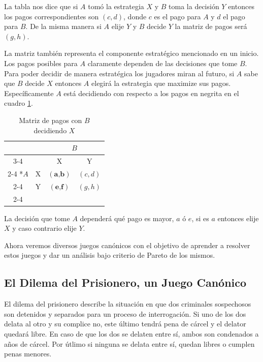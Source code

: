 La tabla nos dice que si $A$ tomó la estrategia $X$ y $B$ toma la decisión $Y$ entonces los pagos correspondientes son $(c,d)$, donde $c$ es el pago para $A$ y $d$ el pago para $B$. De la misma manera si $A$ elije $Y$ y $B$ decide $Y$ la matriz de pagos será $(g,h)$. 

La matriz también representa el componente estratégico mencionado en un inicio. Los pagos posibles para $A$ claramente dependen de las decisiones que tome $B$. Para poder decidir de manera estratégica los jugadores miran al futuro, si $A$ sabe que $B$ decide $X$ entonces $A$ elegirá la estrategia que maximize sus pagos. Específicamente $A$ está decidiendo con respecto a los pagos en negrita en el cuadro \ref{cuadro: B decide X}.

\begin{table}[!htbp]
  \centering
  \caption{Matriz de pagos con $B$ decidiendo $X$} \label{cuadro: B decide X}
  \setlength{\extrarowheight}{2pt}
  \begin{tabular}{*{4}{c|}}
    \multicolumn{2}{c}{} & \multicolumn{2}{c}{$B$}\\\cline{3-4}
    \multicolumn{1}{c}{} &  & X  & Y \\\cline{2-4}
    \multirow{2}*{$A$}  & X & $(\textbf{a,b})$ & $(c,d)$ \\\cline{2-4}
    & Y & $(\textbf{e,f})$ & $(g,h)$ \\\cline{2-4}  
  \end{tabular}
\end{table}

La decisión que tome $A$ dependerá qué pago es mayor, $a$ ó $e$, si es $a$ entonces elije $X$ y caso contrario elije $Y$.

Ahora veremos diversos juegos canónicos con el objetivo de aprender a resolver estos juegos y dar un análisis bajo criterio de Pareto de los mismos.

\subsection{El Dilema del Prisionero, un Juego Canónico}

El dilema del prisionero describe la situación en que dos criminales sospechosos son detenidos y separados para un proceso de interrogación. Si uno de los dos delata al otro y su complice no, este último tendrá pena de cárcel y el delator quedará libre. En caso de que los dos se delaten entre sí, ambos son condenados a años de cárcel. Por útlimo si ninguna se delata entre sí, quedan libres o cumplen penas menores.


